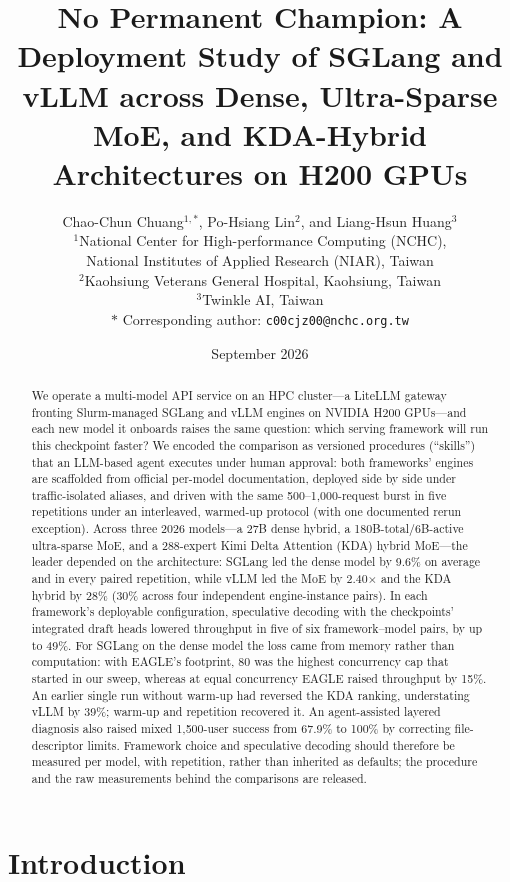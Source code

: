 \documentclass[11pt]{article}
\title{\textbf{No Permanent Champion: A Deployment Study of SGLang and vLLM across Dense, Ultra-Sparse MoE, and KDA-Hybrid Architectures on H200 GPUs}}
\author{
Chao-Chun Chuang$^{1,\ast}$, Po-Hsiang Lin$^{2}$, and Liang-Hsun Huang$^{3}$\\[4pt]
\small $^{1}$National Center for High-performance Computing (NCHC),\\
\small National Institutes of Applied Research (NIAR), Taiwan\\
\small $^{2}$Kaohsiung Veterans General Hospital, Kaohsiung, Taiwan\\
\small $^{3}$Twinkle AI, Taiwan\\[2pt]
\small $\ast$ Corresponding author: \texttt{c00cjz00@nchc.org.tw}
}
\date{September 2026}
\begin{document}
\maketitle

\begin{abstract}
\noindent We operate a multi-model API service on an HPC cluster---a LiteLLM gateway fronting Slurm-managed SGLang and vLLM engines on NVIDIA H200 GPUs---and each new model it onboards raises the same question: which serving framework will run this checkpoint faster? We encoded the comparison as versioned procedures (``skills'') that an LLM-based agent executes under human approval: both frameworks' engines are scaffolded from official per-model documentation, deployed side by side under traffic-isolated aliases, and driven with the same 500--1,000-request burst in five repetitions under an interleaved, warmed-up protocol (with one documented rerun exception). Across three 2026 models---a 27B dense hybrid, a 180B-total/6B-active ultra-sparse MoE, and a 288-expert Kimi Delta Attention (KDA) hybrid MoE---the leader depended on the architecture: SGLang led the dense model by 9.6\% on average and in every paired repetition, while vLLM led the MoE by 2.40$\times$ and the KDA hybrid by 28\% (30\% across four independent engine-instance pairs). In each framework's deployable configuration, speculative decoding with the checkpoints' integrated draft heads lowered throughput in five of six framework--model pairs, by up to 49\%. For SGLang on the dense model the loss came from memory rather than computation: with EAGLE's footprint, 80 was the highest concurrency cap that started in our sweep, whereas at equal concurrency EAGLE raised throughput by 15\%. An earlier single run without warm-up had reversed the KDA ranking, understating vLLM by 39\%; warm-up and repetition recovered it. An agent-assisted layered diagnosis also raised mixed 1,500-user success from 67.9\% to 100\% by correcting file-descriptor limits. Framework choice and speculative decoding should therefore be measured per model, with repetition, rather than inherited as defaults; the procedure and the raw measurements behind the comparisons are released.
\end{abstract}

\section{Introduction}
\end{document}
